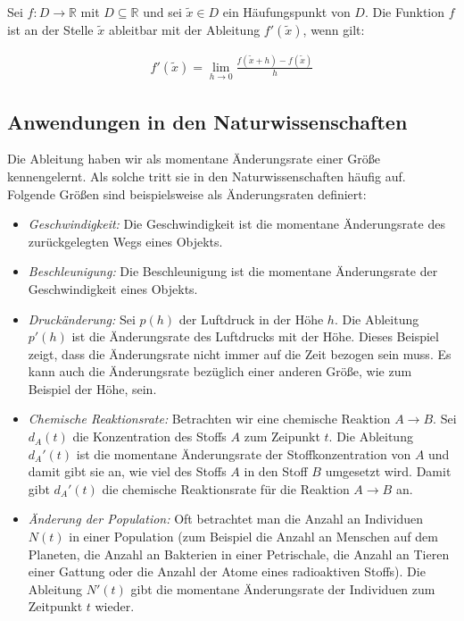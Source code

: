 \documentclass[fontsize=9pt,
               parskip=half-,
               DIV=14,
               listof=chapterentry,
               tocflat]{scrbook}
\begin{document}
\begin{importantparagraph*}
Sei $f:D\to \mathbb {R} $ mit $D\subseteq \mathbb {R} $ und sei ${\tilde {x}}\in D$ ein Häufungspunkt von $D$. Die Funktion $f$ ist an der Stelle ${\tilde {x}}$ ableitbar mit der Ableitung $f'({\tilde {x}})$, wenn gilt:

\begin{align*}
f'({\tilde {x}})=\lim _{h\to 0}{\frac {f({\tilde {x}}+h)-f({\tilde {x}})}{h}}
\end{align*}

\end{importantparagraph*}

\subsection{Anwendungen in den Naturwissenschaften}

Die Ableitung haben wir als momentane Änderungsrate einer Größe kennengelernt. Als solche tritt sie in den Naturwissenschaften häufig auf. Folgende Größen sind beispielsweise als Änderungsraten definiert:

\begin{itemize}
\item \emph{Geschwindigkeit:} Die Geschwindigkeit ist die momentane Änderungsrate des zurückgelegten Wegs eines Objekts.
\item \emph{Beschleunigung:} Die Beschleunigung ist die momentane Änderungsrate der Geschwindigkeit eines Objekts.
\item \emph{Druckänderung:} Sei $p(h)$ der Luftdruck in der Höhe $h$. Die Ableitung $p'(h)$ ist die Änderungsrate des Luftdrucks mit der Höhe. Dieses Beispiel zeigt, dass die Änderungsrate nicht immer auf die Zeit bezogen sein muss. Es kann auch die Änderungsrate bezüglich einer anderen Größe, wie zum Beispiel der Höhe, sein.
\item \emph{Chemische Reaktionsrate:} Betrachten wir eine chemische Reaktion $A\to B$. Sei $d_{A}(t)$ die Konzentration des Stoffs $A$ zum Zeipunkt $t$. Die Ableitung $d_{A}'(t)$ ist die momentane Änderungsrate der Stoffkonzentration von $A$ und damit gibt sie an, wie viel des Stoffs $A$ in den Stoff $B$ umgesetzt wird. Damit gibt $d_{A}'(t)$ die chemische Reaktionsrate für die Reaktion $A\to B$ an.
\item \emph{Änderung der Population:} Oft betrachtet man die Anzahl an Individuen $N(t)$ in einer Population (zum Beispiel die Anzahl an Menschen auf dem Planeten, die Anzahl an Bakterien in einer Petrischale, die Anzahl an Tieren einer Gattung oder die Anzahl der Atome eines radioaktiven Stoffs). Die Ableitung $N'(t)$ gibt die momentane Änderungsrate der Individuen zum Zeitpunkt $t$ wieder.
\end{itemize}
\end{document}
